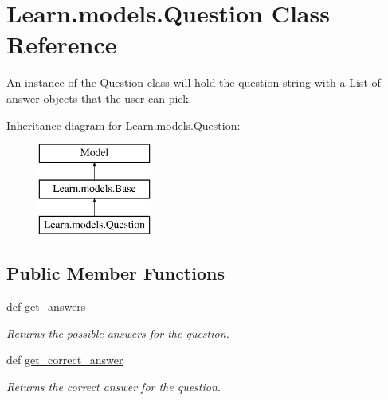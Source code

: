 \hypertarget{class_learn_1_1models_1_1_question}{\section{Learn.\-models.\-Question Class Reference}
\label{class_learn_1_1models_1_1_question}
}


An instance of the \hyperlink{class_learn_1_1models_1_1_question}{Question} class will hold the question string with a List of answer objects that the user can pick.  


Inheritance diagram for Learn.\-models.\-Question\-:\begin{figure}[H]
\begin{center}
\leavevmode
\includegraphics[height=3.000000cm]{class_learn_1_1models_1_1_question}
\end{center}
\end{figure}
\subsection*{Public Member Functions}
\begin{DoxyCompactItemize}
\item 
\hypertarget{class_learn_1_1models_1_1_question_a20099b8a66509aabc45c926eb1b8ab66}{def \hyperlink{class_learn_1_1models_1_1_question_a20099b8a66509aabc45c926eb1b8ab66}{get\-\_\-answers}}\label{class_learn_1_1models_1_1_question_a20099b8a66509aabc45c926eb1b8ab66}

\begin{DoxyCompactList}\small\item\em Returns the possible answers for the question. \end{DoxyCompactList}\item 
\hypertarget{class_learn_1_1models_1_1_question_a308fcf01d3db05841a842996789b2507}{def \hyperlink{class_learn_1_1models_1_1_question_a308fcf01d3db05841a842996789b2507}{get\-\_\-correct\-\_\-answer}}\label{class_learn_1_1models_1_1_question_a308fcf01d3db05841a842996789b2507}

\begin{DoxyCompactList}\small\item\em Returns the correct answer for the question. \end{DoxyCompactList}\end{DoxyCompactItemize}

